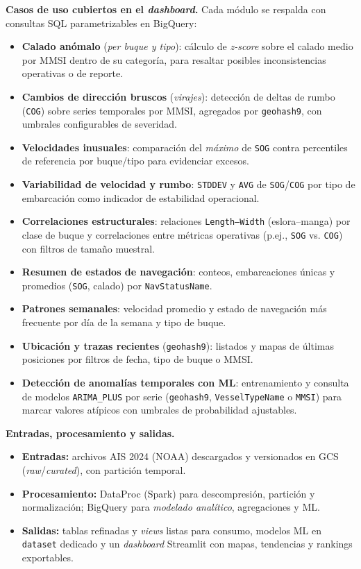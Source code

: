 \documentclass[10pt]{article}
\begin{document}
\vspace{0.2cm}
\noindent\textbf{Casos de uso cubiertos en el \textit{dashboard}.} Cada módulo se respalda con consultas SQL parametrizables en BigQuery:
\begin{itemize}
  \item \textbf{Calado anómalo} (\emph{per buque y tipo}): cálculo de \emph{z-score} sobre el calado medio por MMSI dentro de su categoría, para resaltar posibles inconsistencias operativas o de reporte.
  \item \textbf{Cambios de dirección bruscos} (\emph{virajes}): detección de deltas de rumbo (\texttt{COG}) sobre series temporales por MMSI, agregados por \texttt{geohash9}, con umbrales configurables de severidad.
  \item \textbf{Velocidades inusuales}: comparación del \textit{máximo} de \texttt{SOG} contra percentiles de referencia por buque/tipo para evidenciar excesos.
  \item \textbf{Variabilidad de velocidad y rumbo}: \texttt{STDDEV} y \texttt{AVG} de \texttt{SOG}/\texttt{COG} por tipo de embarcación como indicador de estabilidad operacional.
  \item \textbf{Correlaciones estructurales}: relaciones \texttt{Length–Width} (eslora–manga) por clase de buque y correlaciones entre métricas operativas (p.ej., \texttt{SOG} vs. \texttt{COG}) con filtros de tamaño muestral.
  \item \textbf{Resumen de estados de navegación}: conteos, embarcaciones únicas y promedios (\texttt{SOG}, calado) por \texttt{NavStatusName}.
  \item \textbf{Patrones semanales}: velocidad promedio y estado de navegación más frecuente por día de la semana y tipo de buque.
  \item \textbf{Ubicación y trazas recientes} (\texttt{geohash9}): listados y mapas de últimas posiciones por filtros de fecha, tipo de buque o MMSI.
  \item \textbf{Detección de anomalías temporales con ML}: entrenamiento y consulta de modelos \texttt{ARIMA\_PLUS} por serie (\texttt{geohash9}, \texttt{VesselTypeName} o \texttt{MMSI}) para marcar valores atípicos con umbrales de probabilidad ajustables.
\end{itemize}

\vspace{0.2cm}
\noindent\textbf{Entradas, procesamiento y salidas.}
\begin{itemize}
  \item \textbf{Entradas:} archivos AIS 2024 (NOAA) descargados y versionados en GCS (\textit{raw}/\textit{curated}), con partición temporal.
  \item \textbf{Procesamiento:} DataProc (Spark) para descompresión, partición y normalización; BigQuery para \textit{modelado analítico}, agregaciones y ML.
  \item \textbf{Salidas:} tablas refinadas y \textit{views} listas para consumo, modelos ML en \texttt{dataset} dedicado y un \textit{dashboard} Streamlit con mapas, tendencias y rankings exportables.
\end{itemize}
\end{document}
